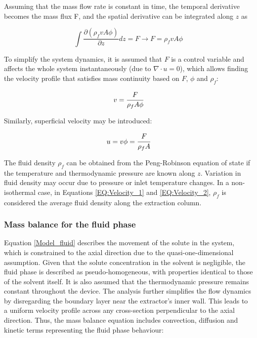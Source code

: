 \documentclass[a4paper,fleqn]{cas-dc}
\begin{document}
	Assuming that the mass flow rate is constant in time, the temporal derivative becomes the mass flux F, and the spatial derivative can be integrated along $z$ as
	
	{\footnotesize
		\begin{equation}
			\int \frac{\partial (\rho_f v A \phi )}{\partial z} dz = F \rightarrow F=\rho_f v A\phi
		\end{equation}
	}
	
	To simplify the system dynamics, it is assumed that $F$ is a control variable and affects the whole system instantaneously (due to $\nabla \cdot u = 0$), which allows finding the velocity profile that satisfies mass continuity based on $F$, $\phi$ and $\rho_f$:
	
	{\footnotesize
		\begin{equation} \label{EQ:Velocity_1}
			v = \cfrac{F}{\rho_f A\phi} 
		\end{equation}
	}
	
	Similarly, superficial velocity may be introduced:
	
	{\footnotesize
		\begin{equation} \label{EQ:Velocity_2}
			u = v \phi = \cfrac{F}{\rho_f A }
		\end{equation}
	}
	
	The fluid density $\rho_f$ can be obtained from the Peng-Robinson equation of state if the temperature and thermodynamic pressure are known along $z$. Variation in fluid density may occur due to pressure or inlet temperature changes. In a non-isothermal case, in Equations \ref{EQ:Velocity_1} and \ref{EQ:Velocity_2}, $\rho_f$ is considered the average fluid density along the extraction column.
	
	\subsubsection{Mass balance for the fluid phase} \label{CH: Mass_balance_fluid}
	
	Equation \ref{Model_fluid} describes the movement of the solute in the system, which is constrained to the axial direction due to the quasi-one-dimensional assumption. Given that the solute concentration in the solvent is negligible, the fluid phase is described as pseudo-homogeneous, with properties identical to those of the solvent itself. It is also assumed that the thermodynamic pressure remains constant throughout the device. The analysis further simplifies the flow dynamics by disregarding the boundary layer near the extractor's inner wall. This leads to a uniform velocity profile across any cross-section perpendicular to the axial direction. Thus, the mass balance equation includes convection, diffusion and kinetic terms representing the fluid phase behaviour:
	
\end{document}

